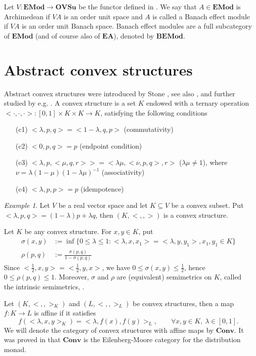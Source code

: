 \documentclass[12pt]{article}
\newcommand{\<}{\langle}
\theoremstyle{remark}
\newtheorem{ex}{Example}
\newcommand{\ct}[1]{\mathbf{#1}}
\begin{document}
Let $V: \ct{EMod}\to \ct{OVSu}$ be the functor defined in \cite{sylvia_plus3}. We say that $A\in \ct{EMod}$ is Archimedean if $VA$ is an order unit space and $A$ is called 
a Banach effect module  if $VA$ is an  order unit Banach space. Banach effect modules are a full subcategory of $\ct{EMod}$ (and of course also of $\ct{EA}$), denoted by 
$\ct{BEMod}$.



\section{Abstract convex structures}

Abstract convex structures were introduced by Stone \cite{stone}, see also \cite{gudder}, and further studied by e.g. \cite{fritz, jacobs}. A convex structure is a set $K$ endowed with a ternary operation $<\cdot,\cdot,\cdot>: [0,1]\times K\times K\to K$, satisfying the following conditions
\begin{enumerate}
\item[(c1)] $<\lambda, p,q> =<1-\lambda,q,p>$ (commutativity)
\item[(c2)] $<0,p,q>=p$ (endpoint condition)
\item[(c3)]  $<\lambda,p,<\mu,q,r>>=<\lambda\mu,<\nu,p,q>,r>$ ($\lambda\mu\neq 1$), where $\nu=\lambda(1-\mu)(1-\lambda\mu)^{-1}$ (associativity)
\item[(c4)] $<\lambda,p,p>=p$ (idempotence)
\end{enumerate}

\begin{ex}\label{ex:geomeric}
Let $V$ be a real vector space and let $K\subseteq V$ be a convex subset. Put $<\lambda,p,q>=(1-\lambda)p+\lambda q$, then $(K,<,,>)$ is a convex structure.
\end{ex}

Let $K$ be any convex structure. For $x,y\in K$, put
\begin{align*}
\sigma(x,y)&:=\inf\{ 0\leq \lambda\leq 1:<\lambda,x,x_1>=<\lambda,y,y_1>, x_1,y_1\in K\}\\
\rho(p,q)&:=\frac{\sigma(p,q)}{1-\sigma(p,q)}
\end{align*}
Since $<\frac{1}{2},x,y>=<\frac{1}{2},y,x>$, we have $0\leq \sigma(x,y)\leq \frac{1}{2}$, hence $0\leq \rho(p,q)\leq 1$. Moreover, $\sigma$ and $\rho$ are (equivalent)  semimetrics on $K$, called the intrinsic semimetrics, \cite{gudder}. 

Let $(K,< , ,>_K)$ and $(L,<, ,>_L)$ be convex structures, then a map $f:K\to L$ is affine if it satisfies
\[
f(<\lambda,x,y>_K)=<\lambda,f(x),f(y)>_L,\qquad \forall x,y\in K,\ \lambda\in [0,1].
\]
We will denote the category of convex structures with affine maps by $\ct{Conv}$. It was proved in \cite{jacobs} that $\ct{Conv}$ is the Eilenberg-Moore category for the distribution monad. 
\end{document}
